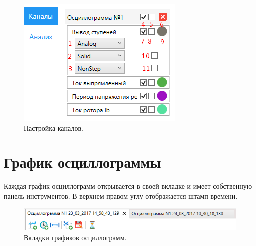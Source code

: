 \documentclass[a4paper,12pt]{article}
\begin{document}
\begin{figure}[h]
\centering
\includegraphics[width=40ex]{image/Channel.png}
\caption{Настройка каналов.}
\end{figure}

\section*{\hspace{.5cm} График осциллограммы}
\hspace{.5cm}Каждая график осциллограмм открывается в своей вкладке и имеет собственную панель инструментов. В верхнем правом углу отображается штамп времени. 

\begin{figure}[h]
\centering
\includegraphics[width=55ex]{image/Screenshot_2.png}
\caption{Вкладки графиков осциллограмм.}
\end{figure}
\end{document}
